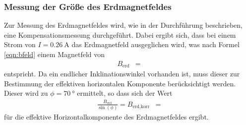 
\subsubsection{Messung der Größe des Erdmagnetfeldes}
Zur Messung des Erdmagnetfeldes wird, wie in der Durchführung beschrieben, eine Kompensationsmessung durchgeführt.
Dabei ergibt sich, dass bei einem Strom von $I = \SI{0.26}{\ampere}$ das Erdmagnetfeld ausgeglichen wird, was nach Formel   \eqref{eqn:bfeld} einem Magnetfeld von
\begin{align*}
  B_\text{erd} &= 
\end{align*}
entspricht.
Da ein endlicher Inklinationswinkel vorhanden ist, muss dieser zur Bestimmung der effektiven horizontalen Komponente berücksichtigt werden.
Dieser wird zu $\phi = \SI{70}{\degree}$ ermittelt, so dass sich der Wert
\begin{align*}
  \frac{B_\text{erd}}{\sin{(\phi)}} = B_\text{erd,korr} &= 
\end{align*}
für die effektive Horizontalkomponente des Erdmagnetfeldes ergibt.

